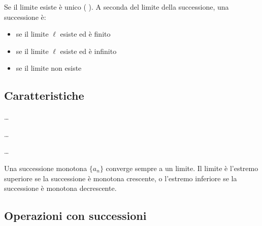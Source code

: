 \documentclass[letterpaper,10pt,italian]{jupyterBook}
\begin{document}
\sphinxAtStartPar
Se il limite esiste è unico ( ). A seconda del limite della successione, una successione è:
\begin{itemize}
\item {} 
\sphinxAtStartPar
{} se il limite \(\ell\) esiste ed è finito

\item {} 
\sphinxAtStartPar
{} se il limite \(\ell\) esiste ed è infinito

\item {} 
\sphinxAtStartPar
{} se il limite non esiste

\end{itemize}


\subsection{Caratteristiche}
\label{\detokenize{ch/series/sequence-numerical-real:caratteristiche}}\label{\detokenize{ch/series/sequence-numerical-real:math-hs-sequence-numerical-real-properties}}
\sphinxAtStartPar
{} …

\sphinxAtStartPar
{} …

\sphinxAtStartPar
{} …

\sphinxAtStartPar
{} Una successione monotona \(\{ a_n \}\) converge sempre a un limite. Il limite è l’estremo superiore se la successione è monotona crescente, o l’estremo inferiore se la successione è monotona decrescente.

\sphinxAtStartPar
{}

\sphinxAtStartPar
{}


\subsection{Operazioni con successioni}
\label{\detokenize{ch/series/sequence-numerical-real:operazioni-con-successioni}}
\sphinxAtStartPar
{}
\end{document}
